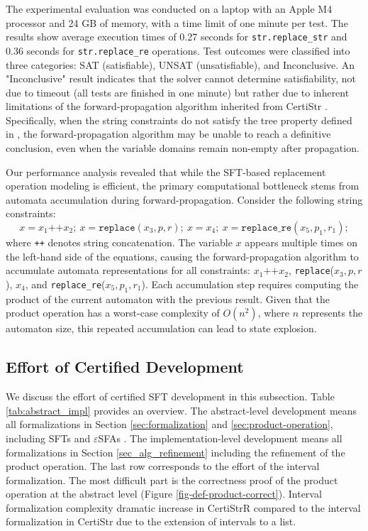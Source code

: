 \documentclass[a4paper,UKenglish,cleveref, autoref, thm-restate]{lipics-v2021}
\begin{document}
The experimental evaluation was conducted on a laptop with an Apple M4 processor and 24 GB of memory, with a time limit of one minute per test. 
The results show average execution times of 0.27 seconds for \texttt{str.replace\_str} and 0.36 seconds for \texttt{str.replace\_re} operations. Test outcomes were classified into three categories: SAT (satisfiable), UNSAT (unsatisfiable), and Inconclusive.
%
An "Inconclusive" result indicates that the solver cannot determine satisfiability, not due to timeout (all tests are finished in one minute) but rather due to inherent limitations of the forward-propagation algorithm inherited from CertiStr \cite{cpp/KanLRS22}. Specifically, when the string constraints do not satisfy the tree property defined in \cite{cpp/KanLRS22}, the forward-propagation algorithm may be unable to reach a definitive conclusion, even when the variable domains remain non-empty after propagation.



Our performance analysis revealed that while the SFT-based replacement operation modeling is efficient, the primary computational bottleneck stems from automata accumulation during  forward-propagation. Consider the following string constraints:
\[
x = x_1\texttt{++}x_2;~x = \texttt{replace}(x_3, p, r);~x = x_4;~x = \texttt{replace\_re}(x_5, p_1, r_1);
\]
where \texttt{++} denotes string concatenation. The variable $x$ appears multiple times on the left-hand side of the equations, causing the forward-propagation algorithm to accumulate automata representations for all constraints: $x_1\texttt{++}x_2$, \texttt{replace}($x_3, p, r$), $x_4$, and \texttt{replace\_re}($x_5, p_1, r_1$). Each accumulation step requires computing the product of the current automaton with the previous result. Given that the product operation has a worst-case complexity of $O(n^2)$, where $n$ represents the automaton size, this repeated accumulation can lead to state explosion.


\subsection{Effort of Certified Development}

We discuss the effort of certified SFT development in this subsection.
Table \ref{tab:abstract_impl} provides an overview. The abstract-level development means all formalizations in Section \ref{sec:formalization} and  \ref{sec:product-operation}, including SFTs and $\varepsilon$SFAs . The implementation-level development means all formalizations in Section \ref{sec_alg_refinement} including the refinement of the product operation. The last row corresponds to the effort of the interval formalization. The most difficult part is the correctness proof of the product operation at the abstract level (Figure \ref{fig-def-product-correct}).
Interval formalization complexity dramatic increase in CertiStrR compared to the interval formalization in CertiStr \cite{cpp/KanLRS22} due to the extension of intervals to a list.
\end{document}
